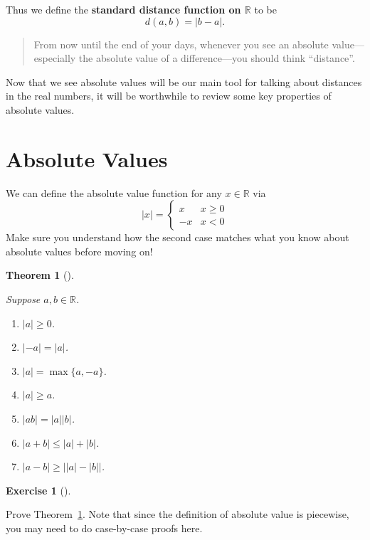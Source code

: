 \documentclass[
  letterpaper,
  DIV=11,
  numbers=noendperiod]{scrreprt}
\providecommand{\tightlist}{%
  \setlength{\itemsep}{0pt}\setlength{\parskip}{0pt}}
\def\R{\mathbb R}
\theoremstyle{plain}
\newtheorem{theorem}{Theorem}[chapter]
\theoremstyle{definition}
\newtheorem{exercise}{Exercise}[chapter]
\theoremstyle{plain}
\theoremstyle{plain}
\theoremstyle{definition}
\theoremstyle{definition}
\theoremstyle{remark}
\begin{document}
Thus we define the \textbf{standard distance function on \(\R\)} to be
\[d(a,b)=|b-a|.\]

\begin{quote}
From now until the end of your days, whenever you see an absolute
value---especially the absolute value of a difference---you should think
``distance''.
\end{quote}

Now that we see absolute values will be our main tool for talking about
distances in the real numbers, it will be worthwhile to review some key
properties of absolute values.

\section{Absolute Values}\label{absolute-values}

We can define the absolute value function for any \(x\in\R\) via
\[|x|=\begin{cases} x & x\geq 0 \\ -x & x<0 \end{cases}\] Make sure you
understand how the second case matches what you know about absolute
values before moving on!

\begin{theorem}[]\protect\hypertarget{thm-absolute-value-props}{}\label{thm-absolute-value-props}

Suppose \(a,b\in\R\).

\begin{enumerate}
\def\labelenumi{\arabic{enumi}.}
\tightlist
\item
  \(|a|\geq0\).
\item
  \(|-a|=|a|\).
\item
  \(|a|=\max\{a,-a\}\).
\item
  \(|a|\geq a\).
\item
  \(|ab|=|a||b|\).
\item
  \(|a+b|\leq|a|+|b|\).
\item
  \(|a-b|\geq\big||a|-|b|\big|\).
\end{enumerate}

\end{theorem}

\begin{exercise}[]\protect\hypertarget{exr-absolute-value-basics}{}\label{exr-absolute-value-basics}

Prove Theorem~\ref{thm-absolute-value-props}. Note that since the
definition of absolute value is piecewise, you may need to do
case-by-case proofs here.

\end{exercise}
\end{document}
